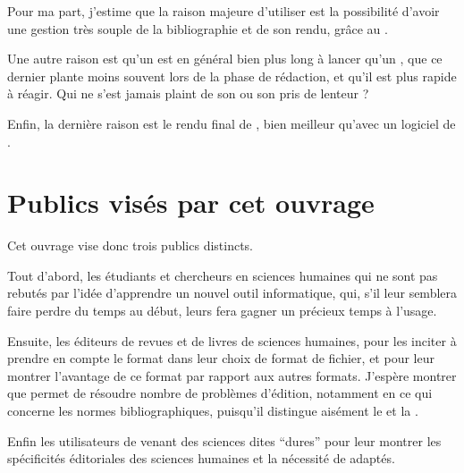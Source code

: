 Pour ma part, j'estime que la raison majeure d'utiliser \logiciel{\LaTeX} est la possibilité d'avoir une gestion très souple de la bibliographie et de son rendu, grâce au  . 

Une autre raison est qu'un  est en général bien plus long à lancer qu'un , que ce dernier plante moins souvent lors de la phase de rédaction, et qu'il est plus rapide à réagir. Qui ne s'est jamais plaint de son  ou son  pris de lenteur ?

Enfin, la dernière raison est le rendu  final de \logiciel{\LaTeX}, bien meilleur qu'avec un logiciel de .


\section{Publics visés par cet ouvrage}

Cet ouvrage vise donc trois publics distincts.

Tout d'abord, les étudiants et chercheurs en sciences humaines qui ne sont pas rebutés par l'idée d'apprendre un nouvel outil informatique, qui, s'il leur semblera faire perdre du temps au début, leurs fera gagner un précieux temps à l'usage.

Ensuite, les éditeurs de revues et de livres de sciences humaines, pour les inciter à prendre en compte le format \concept{\LaTeX} dans leur choix de format de fichier, et pour leur montrer l'avantage de ce format par rapport aux autres formats. J'espère montrer que \logiciel{\LaTeX} permet de résoudre nombre de problèmes d'édition, notamment en ce qui concerne les normes bibliographiques, puisqu'il distingue aisément le  et la .

Enfin les utilisateurs de \logiciel{\LaTeX} venant des sciences dites \enquote{dures} pour leur montrer les spécificités éditoriales des sciences humaines et la nécessité de  adaptés.

